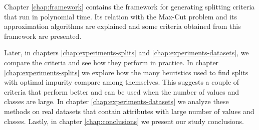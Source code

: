 Chapter \ref{chap:framework} contains the framework for generating splitting criteria that run in polynomial time. Its relation with the Max-Cut problem and its approximation algorithms are explained and some criteria obtained from this framework are presented.

Later, in chapters \ref{chap:experiments-splits} and \ref{chap:experiments-datasets}, we compare the criteria and see how they perform in practice. In chapter \ref{chap:experiments-splits} we explore how the many heuristics used to find splits with optimal impurity compare among themselves. This suggests a couple of criteria that perform better and can be used when the number of values and classes are large. In chapter \ref{chap:experiments-datasets} we analyze these methods on real datasets that contain attributes with large number of values and classes. Lastly, in chapter \ref{chap:conclusions} we present our study conclusions.